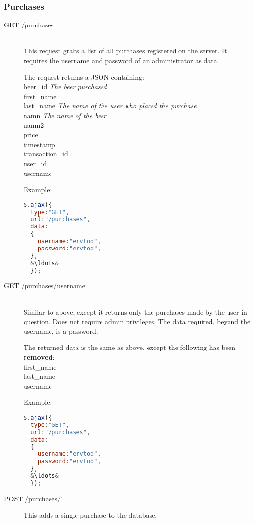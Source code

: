 \documentclass[a4paper]{article}
\begin{document}
\subsubsection{Purchases}
\begin{description}
\item[GET /purchases]\hfill\\
  This request grabs a list of all purchases registered on the server.
  It requires the username and password of an administrator as data.

  The request returns a JSON containing:\hfill\\
  beer\_id \textit{The beer purchased}\hfill\\
  first\_name \hfill\\
  last\_name \textit{The name of the user who placed the purchase}\hfill\\
  namn \textit{The name of the beer}\hfill\\
  namn2 \hfill\\
  price \hfill\\
  timestamp \hfill\\
  transaction\_id\hfill\\
  user\_id\hfill\\
  username
 
  Example:\hfill\\
  \begin{lstlisting}[language=javascript, frame=single, showstringspaces = false, basicstyle=\small\ttfamily, escapechar=\&]
$.ajax({
  type:"GET",
  url:"/purchases",
  data:
  {
    username:"ervtod",
    password:"ervtod",
  },
  &\ldots&
  });
  \end{lstlisting}

  \item[GET /purchases/{username}]\hfill\\
    Similar to above, except it returns only the purchases made by the user in question. Does not require admin privileges.
    The data required, beyond the username, is a password.

    The returned data is the same as above, except the following has been \textbf{removed}:\hfill\\
    first\_name\hfill\\
    last\_name\hfill\\
    username
    
      Example:\hfill\\
  \begin{lstlisting}[language=javascript, frame=single, showstringspaces = false, basicstyle=\small\ttfamily, escapechar=\&]
$.ajax({
  type:"GET",
  url:"/purchases",
  data:
  {
    username:"ervtod",
    password:"ervtod",
  },
  &\ldots&
  });
  \end{lstlisting}
\item[POST /purchases/']
  This adds a single purchase to the database.


\end{description}
\end{document}

